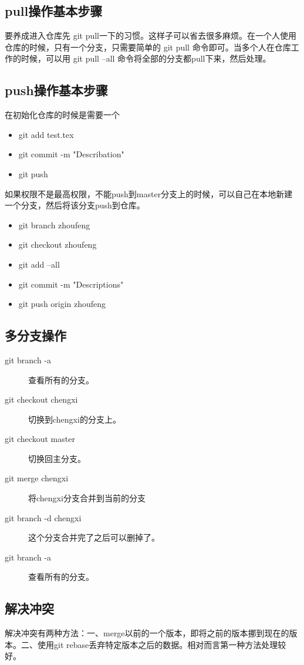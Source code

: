 \documentclass[a4paper,12pt]{ctexart}
\begin{document}
\newpage
\subsection{pull操作基本步骤}
要养成进入仓库先 git pull一下的习惯。这样子可以省去很多麻烦。在一个人使用仓库的时候，只有一个分支，只需要简单的 git pull 命令即可。当多个人在仓库工作的时候，可以用 git pull --all 命令将全部的分支都pull下来，然后处理。

\newpage
\subsection{push操作基本步骤}
在初始化仓库的时候是需要一个
\begin{itemize}
   \item git add test.tex
   \item git commit -m "Describation"
   \item git push
\end{itemize}
如果权限不是最高权限，不能push到master分支上的时候，可以自己在本地新建一个分支，然后将该分支push到仓库。
\begin{itemize}
  \item git branch zhoufeng
  \item git checkout zhoufeng
  \item git add --all
  \item git commit -m "Descriptions"
  \item git push origin zhoufeng
\end{itemize}

\subsection{多分支操作}
\begin{description}
  \item[git branch -a]  查看所有的分支。
  \item[git checkout chengxi]   切换到chengxi的分支上。
  \item[git checkout master]    切换回主分支。
  \item[git merge chengxi]  将chengxi分支合并到当前的分支
  \item[git branch -d chengxi]  这个分支合并完了之后可以删掉了。
  \item[git branch -a]  查看所有的分支。
\end{description}

\subsection{解决冲突}
解决冲突有两种方法：一、merge以前的一个版本，即将之前的版本挪到现在的版本。二、使用git rebase丢弃特定版本之后的数据。相对而言第一种方法处理较好。
\end{document}
